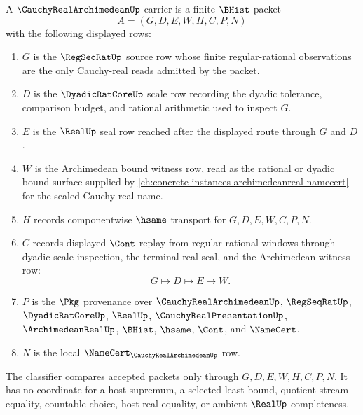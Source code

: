 \begin{definition}
\label{def:cauchy-real-archimedean-carrier}
A $\CauchyRealArchimedeanUp$ carrier is a finite $\BHist$ packet
$$
A=(G,D,E,W,H,C,P,N)
$$
with the following displayed rows:
\begin{enumerate}
\item $G$ is the $\RegSeqRatUp$ source row whose finite regular-rational observations are the only Cauchy-real reads admitted by the packet.
\item $D$ is the $\DyadicRatCoreUp$ scale row recording the dyadic tolerance, comparison budget, and rational arithmetic used to inspect $G$.
\item $E$ is the $\RealUp$ seal row reached after the displayed route through $G$ and $D$.
\item $W$ is the Archimedean bound witness row, read as the rational or dyadic bound surface supplied by \autoref{ch:concrete-instances-archimedeanreal-namecert} for the sealed Cauchy-real name.
\item $H$ records componentwise $\hsame$ transport for $G,D,E,W,C,P,N$.
\item $C$ records displayed $\Cont$ replay from regular-rational windows through dyadic scale inspection, the terminal real seal, and the Archimedean witness row:
$$
G \longmapsto D \longmapsto E \longmapsto W .
$$
\item $P$ is the $\Pkg$ provenance over $\CauchyRealArchimedeanUp$, $\RegSeqRatUp$, $\DyadicRatCoreUp$, $\RealUp$, $\CauchyRealPresentationUp$, $\ArchimedeanRealUp$, $\BHist$, $\hsame$, $\Cont$, and $\NameCert$.
\item $N$ is the local $\NameCert_{\CauchyRealArchimedeanUp}$ row.
\end{enumerate}
The classifier compares accepted packets only through $G,D,E,W,H,C,P,N$. It has no coordinate for a host supremum, a selected least bound, quotient stream equality, countable choice, host real equality, or ambient $\RealUp$ completeness.
\end{definition}

